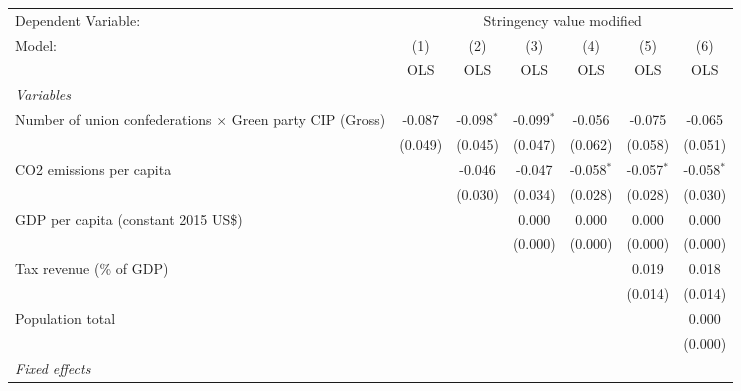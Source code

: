 
\begingroup
\centering
\begin{tabular}{lcccccc}
   \toprule
   Dependent Variable: & \multicolumn{6}{c}{Stringency value modified}\\
   Model:                                                           & (1)     & (2)          & (3)          & (4)          & (5)          & (6)\\  
                                                                    &  OLS    & OLS          & OLS          & OLS          & OLS          & OLS\\  
   \midrule
   \emph{Variables}\\
   Number of union confederations $\times$ Green party CIP (Gross)  & -0.087  & -0.098$^{*}$ & -0.099$^{*}$ & -0.056       & -0.075       & -0.065\\   
                                                                    & (0.049) & (0.045)      & (0.047)      & (0.062)      & (0.058)      & (0.051)\\   
   CO2 emissions per capita                                         &         & -0.046       & -0.047       & -0.058$^{*}$ & -0.057$^{*}$ & -0.058$^{*}$\\   
                                                                    &         & (0.030)      & (0.034)      & (0.028)      & (0.028)      & (0.030)\\   
   GDP per capita (constant 2015 US\$)                              &         &              & 0.000        & 0.000        & 0.000        & 0.000\\   
                                                                    &         &              & (0.000)      & (0.000)      & (0.000)      & (0.000)\\   
   Tax revenue (\% of GDP)                                          &         &              &              &              & 0.019        & 0.018\\   
                                                                    &         &              &              &              & (0.014)      & (0.014)\\   
   Population total                                                 &         &              &              &              &              & 0.000\\   
                                                                    &         &              &              &              &              & (0.000)\\   
   \emph{Fixed effects}\\

\end{tabular}
